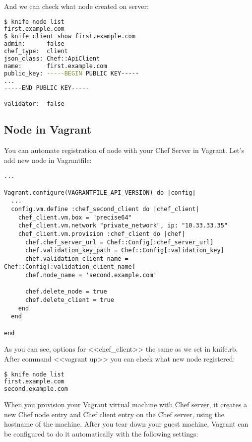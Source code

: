 And we can check what node created on server:

\begin{lstlisting}[language=Bash,label=lst:my-server-cloud-node6]
$ knife node list
first.example.com
$ knife client show first.example.com
admin:      false
chef_type:  client
json_class: Chef::ApiClient
name:       first.example.com
public_key: -----BEGIN PUBLIC KEY-----
...
-----END PUBLIC KEY-----

validator:  false
\end{lstlisting}

\subsection{Node in Vagrant}

You can automate registration of node with your Chef Server in Vagrant. Let's add new node in Vagrantfile:

\begin{lstlisting}[label=lst:my-server-cloud-node7,title=my-server-cloud/Vagrantfile]
...

Vagrant.configure(VAGRANTFILE_API_VERSION) do |config|
  ...
  config.vm.define :chef_second_client do |chef_client|
    chef_client.vm.box = "precise64"
    chef_client.vm.network "private_network", ip: "10.33.33.35"
    chef_client.vm.provision :chef_client do |chef|
      chef.chef_server_url = Chef::Config[:chef_server_url]
      chef.validation_key_path = Chef::Config[:validation_key]
      chef.validation_client_name = Chef::Config[:validation_client_name]
      chef.node_name = 'second.example.com'

      chef.delete_node = true
      chef.delete_client = true
    end
  end

end
\end{lstlisting}

As you can see, options for <<chef\_client>> the same as we set in knife.rb. After command <<vagrant up>> you can check what new node registered:

\begin{lstlisting}[language=Bash,label=lst:my-server-cloud-node10]
$ knife node list
first.example.com
second.example.com
\end{lstlisting}

When you provision your Vagrant virtual machine with Chef server, it creates a new Chef node entry and Chef client entry on the Chef server, using the hostname of the machine. After you tear down your guest machine, Vagrant can be configured to do it automatically with the following settings:

